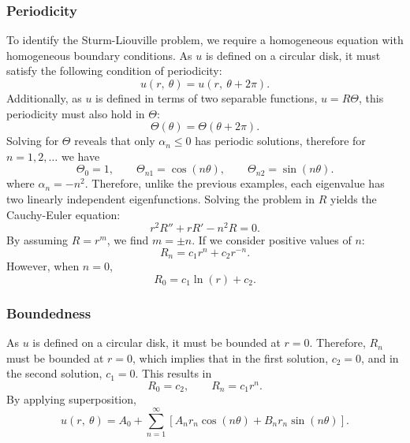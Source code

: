 \documentclass{article}
\begin{document}
\subsubsection{Periodicity}
To identify the Sturm-Liouville problem, we require a homogeneous equation
with homogeneous boundary conditions.
As \(u\) is defined on a circular disk, it must satisfy the following condition of
periodicity:
\begin{equation*}
    u\left( r,\: \theta \right) = u\left( r,\: \theta + 2\pi \right).
\end{equation*}
Additionally, as \(u\) is defined in terms of two separable functions,
\(u = R \Theta\), this periodicity must also hold in \(\Theta\):
\begin{equation*}
    \Theta\left( \theta \right) = \Theta\left( \theta + 2\pi \right).
\end{equation*}
Solving for \(\Theta\) reveals that only \(\alpha_n \leqslant 0\) has
periodic solutions, therefore for \(n = 1, 2, \ldots\) we have
\begin{equation*}
    \Theta_0 = 1, \quad\quad \Theta_{n1} = \cos{\left( n\theta \right)}, \quad\quad \Theta_{n2} = \sin{\left( n\theta \right)}.
\end{equation*}
where \(\alpha_n = -n^2\). Therefore, unlike the previous examples, each eigenvalue
has two linearly independent eigenfunctions. Solving the problem in \(R\) yields
the Cauchy-Euler equation:
\begin{equation*}
    r^2 R'' + r R' - n^2 R = 0.
\end{equation*}
By assuming \(R = r^m\), we find \(m = \pm n\). If we consider positive values of \(n\):
\begin{equation*}
    R_n = c_1 r^n + c_2 r^{-n}.
\end{equation*}
However, when \(n = 0\),
\begin{equation*}
    R_0 = c_1 \ln{\left( r \right)} + c_2.
\end{equation*}
\subsubsection{Boundedness}
As \(u\) is defined on a circular disk, it must be bounded at \(r = 0\).
Therefore, \(R_n\) must be bounded at \(r = 0\), which implies that in the first solution,
\(c_2 = 0\), and in the second solution, \(c_1 = 0\). This results in
\begin{equation*}
    R_0 = c_2, \quad\quad R_n = c_1 r^n.
\end{equation*}
By applying superposition,
\begin{equation*}
    u\left( r,\: \theta \right) = A_0 + \sum_{n = 1}^\infty \left[ A_n r_n \cos{\left( n \theta \right)} + B_n r_n \sin{\left( n \theta \right)} \right].
\end{equation*}
\end{document}
